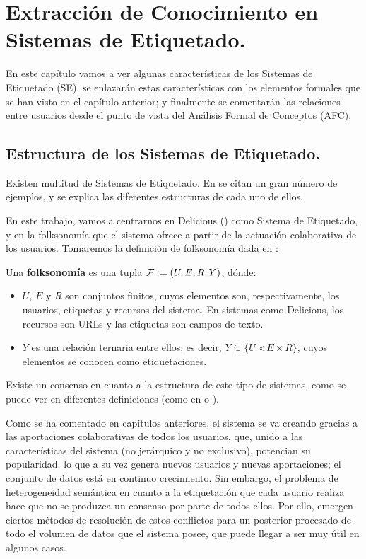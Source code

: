 \chapter{Extracción de Conocimiento en Sistemas de Etiquetado.}\label{cap:capitulo3}

En este capítulo vamos a ver algunas características de los Sistemas de Etiquetado (SE), se enlazarán estas características con los elementos formales que se han visto en el capítulo anterior; y finalmente se comentarán las relaciones entre usuarios desde el punto de vista del Análisis Formal de Conceptos (AFC).

\section{Estructura de los Sistemas de Etiquetado.}

Existen multitud de Sistemas de Etiquetado. En \cite{smith} se citan un gran número de ejemplos, y se explica las diferentes estructuras de cada uno de ellos.

En este trabajo, vamos a centrarnos en Delicious (\cite{delicious}) como Sistema de Etiquetado, y en la folksonomía que el sistema ofrece a partir de la actuación colaborativa de los usuarios. Tomaremos la definición de folksonomía dada en \cite{jaschke}:

\begin{defi}
Una {\bf folksonomía} es una tupla ${\cal F} := (U,E,R,Y)$, dónde:
\begin{itemize}
	\item $U$, $E$ y $R$ son conjuntos finitos, cuyos elementos son, respectivamente, los usuarios, etiquetas y recursos del sistema. En sistemas como Delicious, los recursos son URLs y las etiquetas son campos de texto.
	\item $Y$ es una relación ternaria entre ellos; es decir, $Y  \subseteq \{ U \times{E \times{R}}\}$, cuyos elementos se conocen como etiquetaciones.
\end{itemize}
\end{defi}

Existe un consenso en cuanto a la estructura de este tipo de sistemas, como se puede ver en diferentes definiciones (como en \cite{golder} o \cite{yeung}).

Como se ha comentado en capítulos anteriores, el sistema se va creando gracias a las aportaciones colaborativas de todos los usuarios, que, unido a las características del sistema (no jerárquico y no exclusivo), potencian su popularidad, lo que a su vez genera nuevos usuarios y nuevas aportaciones; el conjunto de datos está en continuo crecimiento. Sin embargo, el problema de heterogeneidad semántica en cuanto a la etiquetación que cada usuario realiza hace que no se produzca un consenso por parte de todos ellos. Por ello, emergen ciertos métodos de resolución de estos conflictos para un posterior procesado de todo el volumen de datos que el sistema posee, que puede llegar a ser muy útil en algunos casos.

